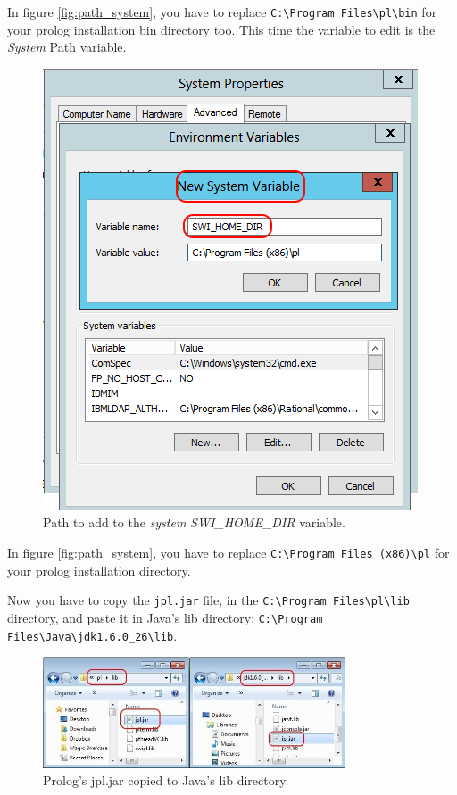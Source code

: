 In figure \ref{fig:path_system}, you have to replace \verb=C:\Program Files\pl\bin= for your prolog installation
bin directory too. This time the variable to edit is the \emph{System} Path
variable.

\begin{figure}[h]
\begin{center}
  \includegraphics[width=0.6\linewidth]{imgs/swi_prolog_path.png}
  \caption{Path to add to the \emph{system} \emph{SWI\_HOME\_DIR} variable.}
  \label{fig:swi_pl_path}
\end{center}
\end{figure}

In figure \ref{fig:path_system}, you have to replace \verb=C:\Program Files (x86)\pl= for your prolog installation
directory.

Now you have to copy the \verb=jpl.jar= file, in the 
\verb=C:\Program Files\pl\lib= 
directory, and paste it in Java's lib directory: 
\verb=C:\Program Files\Java\jdk1.6.0_26\lib=.

\begin{figure}[h]
\begin{center}
  \includegraphics[width=0.8\textwidth]{imgs/jpl_cpy.jpg}
  \caption{Prolog's jpl.jar copied to Java's lib directory.}
  \label{fig:jpl_cpy}
\end{center}
\end{figure}

